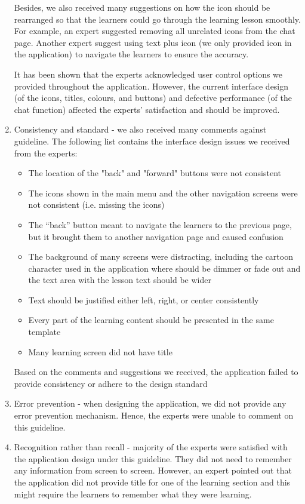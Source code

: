 \begin{enumerate}
Besides, we also received many suggestions on how the icon should be rearranged so that the learners could go through the learning lesson smoothly. For example, an expert suggested removing all unrelated icons from the chat page. Another expert suggest using text plus icon (we only provided icon in the application) to navigate the learners to ensure the accuracy. 

It has been shown that the experts acknowledged user control options we provided throughout the application. However, the current interface design (of the icons, titles, colours, and buttons) and defective performance (of the chat function) affected the experts' satisfaction and should be improved. 

\item Consistency and standard - we also received many comments against guideline. The following list contains the interface design issues we received from the experts: 
\begin{itemize}
\item The location of the "back" and "forward" buttons were not consistent 
\item The icons shown in the main menu and the other navigation screens were not consistent (i.e. missing the icons) 
\item The ``back'' button meant to navigate the learners to the previous page, but it brought them to another navigation page and caused confusion 
\item The background of many screens were distracting, including the cartoon character used in the application where should be dimmer or fade out and the text area with the lesson text should be wider
\item Text should be justified either left, right, or center consistently 
\item Every part of the learning content should be presented in the same template 
\item Many learning screen did not have title
\end{itemize}

Based on the comments and suggestions we received, the application failed to provide consistency or adhere to the design standard

\item Error prevention - when designing the application, we did not provide any error prevention mechanism. Hence, the experts were unable to comment on this guideline. 

\item Recognition rather than recall - majority of the experts were satisfied with the application design under this guideline. They did not need to remember any information from screen to screen. However, an expert pointed out that the application did not provide title for one of the learning section and this might require the learners to remember what they were learning. 


\end{enumerate}
